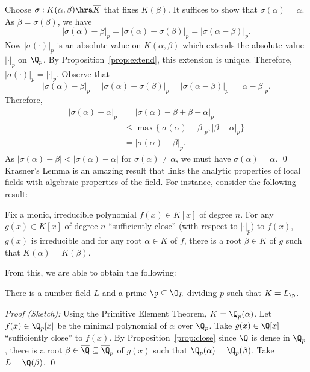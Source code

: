 \pf Choose $\sigma: K(\alpha,\beta) \hra \overline{K}$ that fixes $K(\beta)$. It suffices to show that $\sigma(\alpha)=\alpha$. As $\beta=\sigma(\beta)$, we have
	\[
	|\sigma(\alpha) - \beta|_p = |\sigma(\alpha) - \sigma(\beta)|_p = |\sigma(\alpha-\beta)|_p.
	\]
Now $|\sigma(\cdot)|_p$ is an absolute value on $K(\alpha,\beta)$ which extends the absolute value $|\cdot|_p$ on $\Q_p$. By Proposition~\ref{prop:extend}, this extension is unique. Therefore, $|\sigma(\cdot)|_p=|\cdot|_p$. Observe that
	\[
	|\sigma(\alpha) - \beta|_p = |\sigma(\alpha)-\sigma(\beta)|_p = |\sigma(\alpha-\beta)|_p= |\alpha-\beta|_p.
	\]
Therefore,
	\[
	\begin{split}
	|\sigma(\alpha)-\alpha|_p&= |\sigma(\alpha) - \beta+\beta-\alpha|_p \\
	&\leq \max\{|\sigma(\alpha)-\beta|_p, |\beta-\alpha|_p\} \\
	&=|\sigma(\alpha) - \beta|_p.
	\end{split}
	\]
As $|\sigma(\alpha)-\beta|< |\sigma(\alpha)-\alpha|$ for $\sigma(\alpha) \neq \alpha$, we must have $\sigma(\alpha)=\alpha$. \qed \\

Krasner's Lemma is an amazing result that links the analytic properties of local fields with algebraic properties of the field. For instance, consider the following result:

\begin{prop}\label{prop:close}
Fix a monic, irreducible polynomial $f(x) \in K[x]$ of degree $n$. For any $g(x) \in K[x]$ of degree $n$ ``sufficiently close'' (with respect to $|\cdot|_p$) to $f(x)$, $g(x)$ is irreducible and for any root $\alpha \in \overline{K}$ of $f$, there is a root $\beta \in \overline{K}$ of $g$ such that $K(\alpha)=K(\beta)$. 
\end{prop}

From this, we are able to obtain the following:

\begin{prop}
There is a number field $L$ and a prime $\p \subseteq \O_L$ dividing $p$ such that $K=L_\p$. 
\end{prop}

\noindent \emph{Proof (Sketch): } Using the Primitive Element Theorem, $K=\Q_p(\alpha)$. Let $f(x) \in \Q_p[x]$ be the minimal polynomial of $\alpha$ over $\Q_p$. Take $g(x) \in \Q[x]$ ``sufficiently close'' to $f(x)$. By Proposition~\ref{prop:close} since $\Q$ is dense in $\Q_p$, there is a root $\beta \in \overline{\Q} \subseteq \overline{\Q}_p$ of $g(x)$ such that $\Q_p(\alpha)=\Q_p(\beta)$. Take $L=\Q(\beta)$. \qed \\


